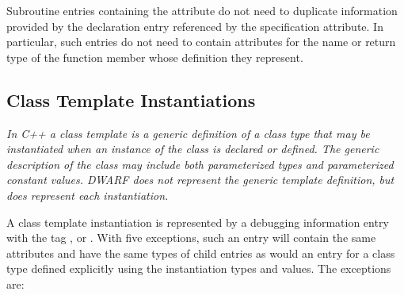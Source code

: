 Subroutine entries containing the 
attribute do not need to duplicate information provided
by the declaration entry referenced by the specification
attribute. In particular, such entries do not need to contain
attributes for the name or return type of the function member
whose definition they represent.

\subsection{Class Template Instantiations}
\label{chap:classtemplateinstantiations}

\textit{In C++ a class template is a generic definition of a class
type that may be instantiated when an instance of the class
is declared or defined. The generic description of the
class may include both parameterized types and parameterized
constant values. DWARF does not represent the generic template
definition, but does represent each instantiation.}

A class template instantiation is represented by a
debugging information entry with the tag ,
 or . With five
exceptions, such an entry will contain the same attributes
and have the same types of child entries as would an entry
for a class type defined explicitly using the instantiation
types and values. The exceptions are:

